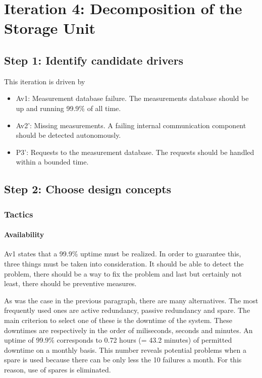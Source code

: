 \section{Iteration 4: Decomposition of the Storage Unit}
\label{add:it4}

\subsection{Step 1: Identify candidate drivers}
\label{add:it4/drivers}

\npar This iteration is driven by

\begin{itemize}
	\item Av1: Measurement database failure. The measurements database should be up
	and running 99.9\% of all time. 
	\item Av2': Missing measurements. A failing internal communication component
	should be detected autonomously. 
  	\item P3': Requests to the measurement database. The requests should be
  	handled within a bounded time. 
\end{itemize}

\subsection{Step 2: Choose design concepts}
\label{add:it4/concepts}

\subsubsection{Tactics}
\label{add:it4/tactics}

\paragraph{Availability} 

\npar Av1 states that a 99.9\% uptime must be realized. In order to guarantee
this, three things must be taken into consideration. It should be able to detect
the problem, there should be a way to fix the problem and last but certainly not
least, there should be preventive measures.

\npar As was the case in the previous paragraph, there are many alternatives.
The most frequently used ones are active redundancy, passive redundancy and
spare. The main criterion to select one of these is the downtime of the system.
These downtimes are respectively in the order of miliseconds, seconds and
minutes. An uptime of 99.9\% corresponds to 0.72 hours (= 43.2 minutes) of
permitted downtime on a monthly basis. This number reveals potential problems
when a spare is used because there can be only less the 10 failures a month. For
this reason, use of spares is eliminated.

